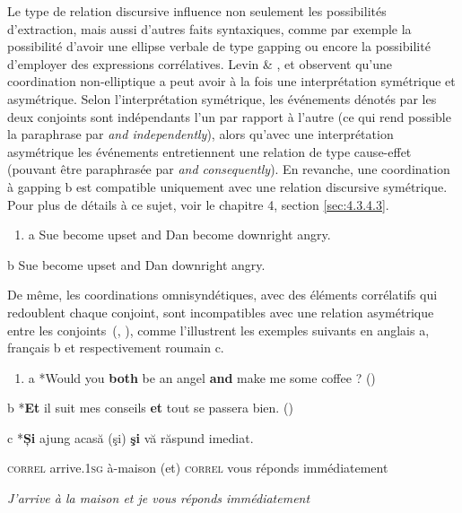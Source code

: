 Le type de relation discursive influence non seulement les possibilités d'extraction, mais aussi d'autres faits syntaxiques, comme par exemple la possibilité d'avoir une ellipse verbale de type gapping ou encore la possibilité d'employer des expressions corrélatives. Levin \& \citet{Prince1986}, \citet{Kehler2002} et \citet{Hendriks2004} observent qu'une coordination non-elliptique a peut avoir à la fois une interprétation symétrique et asymétrique. Selon l'interprétation symétrique, les événements dénotés par les deux conjoints sont indépendants l'un par rapport à l'autre (ce qui rend possible la paraphrase par \textit{and independently}), alors qu'avec une interprétation asymétrique les événements entretiennent une relation de type cause-effet (pouvant être paraphrasée par \textit{and consequently}). En revanche, une coordination à gapping b est compatible uniquement avec une relation discursive symétrique. Pour plus de détails à ce sujet, voir le chapitre 4, section \ref{sec:4.3.4.3}.  


\begin{enumerate}
\item \label{bkm:Ref272884847}a  Sue become upset and Dan become downright angry.


\end{enumerate}
  b  Sue become upset and Dan downright angry.

De même, les coordinations omnisyndétiques, avec des éléments corrélatifs qui redoublent chaque conjoint, sont incompatibles avec une relation asymétrique entre les conjoints~(\citet{Schmerling1972}, \citet{Mouret2007}), comme l'illustrent les exemples suivants en anglais a, français b et respectivement roumain c.  


\begin{enumerate}
\item \label{bkm:Ref300871886}a  *Would you \textbf{both} be an angel \textbf{and} make me some coffee ?  (\citet[30]{Chaves2007}) 


\end{enumerate}
  b  *\textbf{Et} il suit mes conseils \textbf{et} tout se passera bien.     (\citet[191]{Mouret2007})

  c  *\textbf{Și}  ajung  acasă  (şi)  \textbf{şi}  vă  răspund  imediat.

    \textsc{correl } arrive.1\textsc{sg}  à-maison  (et)  \textsc{correl}  vous  réponds  immédiatement

    \textit{J'arrive à la maison et je vous réponds immédiatement}

